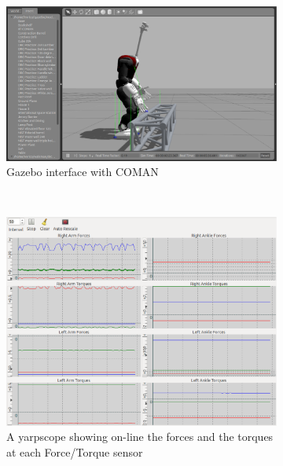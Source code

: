 \begin{figure}
        \centering
        \begin{subfigure}[b]{0.475\textwidth}
                \includegraphics[width=\textwidth]{images/coman_ft_a.eps}
                \caption{Gazebo interface with COMAN}
                \label{yarp_simulation_coman_a}
        \end{subfigure}%
        \\
        \begin{subfigure}[b]{0.475\textwidth}
                \includegraphics[width=\textwidth]{images/coman_ft_b.eps}
                \caption{A yarpscope showing on-line the forces and the torques at each Force/Torque sensor}
                \label{yarp_simulation_coman_b}
        \end{subfigure}
        \\
        \begin{subfigure}[b]{0.475\textwidth}

\end{subfigure}
\end{figure}
